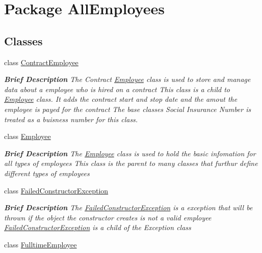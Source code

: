 \hypertarget{namespace_all_employees}{}\section{Package All\+Employees}
\label{namespace_all_employees}
\subsection*{Classes}
\begin{DoxyCompactItemize}
\item 
class \hyperlink{class_all_employees_1_1_contract_employee}{Contract\+Employee}
\begin{DoxyCompactList}\small\item\em {\bfseries Brief Description} The Contract \hyperlink{class_all_employees_1_1_employee}{Employee} class is used to store and manage data about a employee who is hired on a contract This class is a child to \hyperlink{class_all_employees_1_1_employee}{Employee} class. It adds the contract start and stop date and the amout the employee is payed for the contract The base classes Social Insurance Number is treated as a buisness number for this class. \end{DoxyCompactList}\item 
class \hyperlink{class_all_employees_1_1_employee}{Employee}
\begin{DoxyCompactList}\small\item\em {\bfseries Brief Description} The \hyperlink{class_all_employees_1_1_employee}{Employee} class is used to hold the basic infomation for all types of employees This class is the parent to many classes that furthur define different types of employees \end{DoxyCompactList}\item 
class \hyperlink{class_all_employees_1_1_failed_constructor_exception}{Failed\+Constructor\+Exception}
\begin{DoxyCompactList}\small\item\em {\bfseries Brief Description} The \hyperlink{class_all_employees_1_1_failed_constructor_exception}{Failed\+Constructor\+Exception} is a exception that will be thrown if the object the constructor creates is not a valid employee \hyperlink{class_all_employees_1_1_failed_constructor_exception}{Failed\+Constructor\+Exception} is a child of the Exception class \end{DoxyCompactList}\item 
class \hyperlink{class_all_employees_1_1_fulltime_employee}{Fulltime\+Employee}

\end{DoxyCompactItemize}
